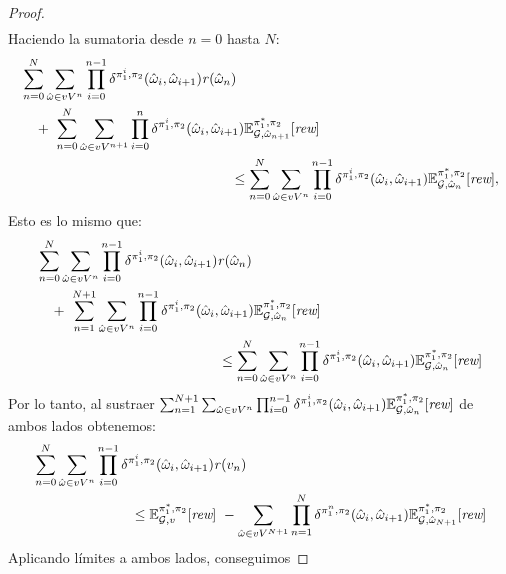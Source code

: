 \begin{proof}
\begin{align*}
  \end{align*}
  Haciendo la sumatoria desde $n=0$ hasta $N$:
  \begin{align*}
    & \sum^{N}_{n=0}\sum_{\hat{\omega} \in vV^{n}} \prod^{n-1}_{i=0}\delta^{\strat{1}^i,\strat{2}}(\hat{\omega}_i,\hat{\omega}_{i+1}) \reward(\hat{\omega}_n) \\
    & \quad + \ \sum^{N}_{n=0} \sum_{\hat{\omega} \in vV^{n+1}} \prod^{n}_{i=0}\delta^{\strat{1}^i,\strat{2}}(\hat{\omega}_i,\hat{\omega}_{i+1})  \Expect{\starredstrat{1}}{\strat{2}}_{\StochG,\hat{\omega}_{n+1}}[\Rewards] \\
    & \hspace{15em} \leq 
	\sum^{N}_{n=0}
	\sum_{\hat{\omega} \in vV^{n}} \prod^{n-1}_{i=0}\delta^{\strat{1}^i,\strat{2}}(\hat{\omega}_i, \hat{\omega}_{i+1}) \Expect{\starredstrat{1}}{\strat{2}}_{\StochG,\hat{\omega}_n}[\Rewards],
  \end{align*}
  Esto es lo mismo que:
  \begin{align*}
    & \sum^{N}_{n=0}\sum_{\hat{\omega} \in vV^{n}} \prod^{n-1}_{i=0}\delta^{\strat{1}^i,\strat{2}}(\hat{\omega}_i,\hat{\omega}_{i+1}) \reward(\hat{\omega}_n) \\
    & \quad + \
	\sum^{N+1}_{n=1} \sum_{\hat{\omega} \in vV^{n}} \prod^{n-1}_{i=0}\delta^{\strat{1}^i,\strat{2}}(\hat{\omega}_i,\hat{\omega}_{i+1})  \Expect{\starredstrat{1}}{\strat{2}}_{\StochG,\hat{\omega}_{n}}[\Rewards] \\
    & \hspace{13em} \leq 
	 \sum^{N}_{n=0}
	\sum_{\hat{\omega} \in vV^{n}} \prod^{n-1}_{i=0}\delta^{\strat{1}^i,\strat{2}}(\hat{\omega}_i, \hat{\omega}_{i+1}) \Expect{\starredstrat{1}}{\strat{2}}_{\StochG,\hat{\omega}_n}[\Rewards]
  \end{align*}
  Por lo tanto, al sustraer $\sum^{N+1}_{n=1} \sum_{\hat{\omega} \in vV^{n}} \prod^{n-1}_{i=0}\delta^{\pi_{1}^i,\pi_{2}}(\hat{\omega}_i,\hat{\omega}_{i+1})  \mathbb{E}^{\pi^*_{1}, \pi_{2}}_{\mathcal{G},\hat{\omega}_{n}}[\textit{rew}]$ de ambos lados obtenemos:
  \begin{align*}
    & \sum^{N}_{n=0}\sum_{\hat{\omega} \in vV^{n}} \prod^{n-1}_{i=0}\delta^{\pi_{1}^i,\pi_{2}}(\hat{\omega}_i, \hat{\omega}_{i+1}) \mathit{r}(v_n)\\
    & \hspace{7em} \leq 
      \mathbb{E}^{\pi^*_{1}, \pi_{2}}_{\mathcal{G},v}[\textit{rew}] \ - \sum_{\hat{\omega} \in vV^{N+1}}\prod^{N}_{n=1}\delta^{\pi_{1}^n,\pi_{2}}(\hat{\omega}_i,\hat{\omega}_{i+1}) \mathbb{E}^{\pi^*_{1}, \pi_{2}}_{\mathcal{G}, \hat{\omega}_{N+1}}[\textit{rew}]
  \end{align*}
  Aplicando límites a ambos lados, conseguimos


\end{proof}
